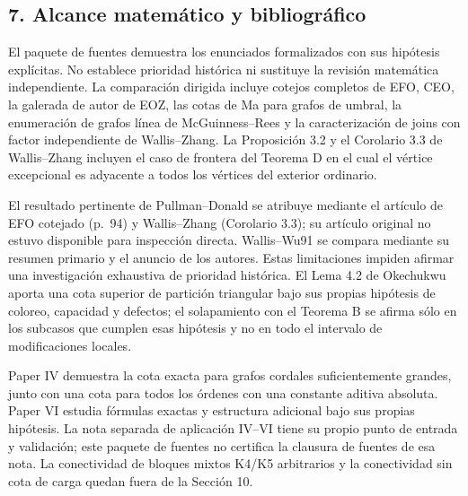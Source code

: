 \documentclass[spanish,11pt,a4paper]{article}
\begin{document}
\subsection{7. Alcance matemático y
bibliográfico}\label{alcance-matemuxe1tico-y-bibliogruxe1fico}

El paquete de fuentes demuestra los enunciados formalizados con sus
hipótesis explícitas. No establece prioridad histórica ni sustituye la
revisión matemática independiente. La comparación dirigida incluye
cotejos completos de EFO, CEO, la galerada de autor de EOZ, las cotas de
Ma para grafos de umbral, la enumeración de grafos línea de
McGuinness--Rees y la caracterización de joins con factor independiente
de Wallis--Zhang. La Proposición 3.2 y el Corolario 3.3 de Wallis--Zhang
incluyen el caso de frontera del Teorema D en el cual el vértice
excepcional es adyacente a todos los vértices del exterior ordinario.

El resultado pertinente de Pullman--Donald se atribuye mediante el
artículo de EFO cotejado (p.~94) y Wallis--Zhang (Corolario 3.3); su
artículo original no estuvo disponible para inspección directa.
Wallis--Wu91 se compara mediante su resumen primario y el anuncio de los
autores. Estas limitaciones impiden afirmar una investigación exhaustiva
de prioridad histórica. El Lema 4.2 de Okechukwu aporta una cota
superior de partición triangular bajo sus propias hipótesis de coloreo,
capacidad y defectos; el solapamiento con el Teorema B se afirma sólo en
los subcasos que cumplen esas hipótesis y no en todo el intervalo de
modificaciones locales.

Paper IV demuestra la cota exacta para grafos cordales suficientemente
grandes, junto con una cota para todos los órdenes con una constante
aditiva absoluta. Paper VI estudia fórmulas exactas y estructura
adicional bajo sus propias hipótesis. La nota separada de aplicación
IV--VI tiene su propio punto de entrada y validación; este paquete de
fuentes no certifica la clausura de fuentes de esa nota. La conectividad
de bloques mixtos K4/K5 arbitrarios y la conectividad sin cota de carga
quedan fuera de la Sección 10.
\end{document}
